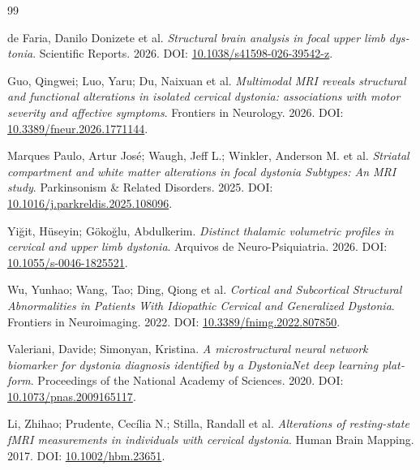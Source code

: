 \begin{thebibliography}{99}
\small
{}
\begin{otherlanguage}{english}
{de Faria}, Danilo Donizete et al. \textit{{Structural brain analysis in focal upper limb dystonia}}. Scientific Reports. 2026. DOI: \url{10.1038/s41598-026-39542-z}.
\end{otherlanguage}
\begin{otherlanguage}{english}
Guo, Qingwei; Luo, Yaru; Du, Naixuan et al. \textit{{Multimodal MRI reveals structural and functional alterations in isolated cervical dystonia: associations with motor severity and affective symptoms}}. Frontiers in Neurology. 2026. DOI: \url{10.3389/fneur.2026.1771144}.
\end{otherlanguage}
\begin{otherlanguage}{english}
{Marques Paulo}, Artur Jos{\'e}; Waugh, Jeff L.; Winkler, Anderson M. et al. \textit{{Striatal compartment and white matter alterations in focal dystonia Subtypes: An MRI study}}. Parkinsonism \& Related Disorders. 2025. DOI: \url{10.1016/j.parkreldis.2025.108096}.
\end{otherlanguage}
\begin{otherlanguage}{english}
Yi\u{g}it, H\"{u}seyin; G\"{o}ko\u{g}lu, Abdulkerim. \textit{{Distinct thalamic volumetric profiles in cervical and upper limb dystonia}}. Arquivos de Neuro-Psiquiatria. 2026. DOI: \url{10.1055/s-0046-1825521}.
\end{otherlanguage}
\begin{otherlanguage}{english}
Wu, Yunhao; Wang, Tao; Ding, Qiong et al. \textit{{Cortical and Subcortical Structural Abnormalities in Patients With Idiopathic Cervical and Generalized Dystonia}}. Frontiers in Neuroimaging. 2022. DOI: \url{10.3389/fnimg.2022.807850}.
\end{otherlanguage}
\begin{otherlanguage}{english}
Valeriani, Davide; Simonyan, Kristina. \textit{{A microstructural neural network biomarker for dystonia diagnosis identified by a DystoniaNet deep learning platform}}. Proceedings of the National Academy of Sciences. 2020. DOI: \url{10.1073/pnas.2009165117}.
\end{otherlanguage}
\begin{otherlanguage}{english}
Li, Zhihao; Prudente, Cec\'{i}lia N.; Stilla, Randall et al. \textit{{Alterations of resting-state fMRI measurements in individuals with cervical dystonia}}. Human Brain Mapping. 2017. DOI: \url{10.1002/hbm.23651}.

\end{otherlanguage}
\end{thebibliography}
